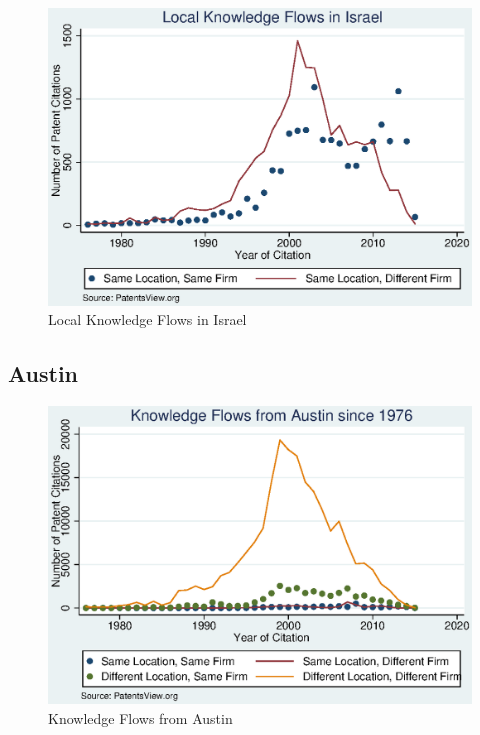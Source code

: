 \documentclass[12pt]{article}
\begin{document}
\begin{figure}[h]
\begin{centering}
  \includegraphics[width=\textwidth]{IsraelLocal1976}
  \caption{Local Knowledge Flows in Israel}
  \label{fig:IsraelLocal1976}
\end{centering}
\end{figure}

\subsection{Austin}

\begin{figure}[h]
\begin{centering}
  \includegraphics[width=\textwidth]{Austin1976}
  \caption{Knowledge Flows from Austin}
  \label{fig:Austin1976}
\end{centering}
\end{figure}
\end{document}
